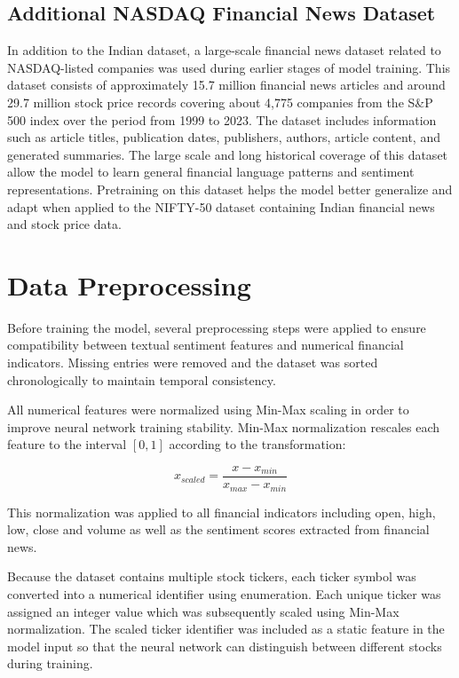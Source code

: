 \documentclass[11pt]{article}
\begin{document}
\subsection{Additional NASDAQ Financial News Dataset}
In addition to the Indian dataset, a large-scale financial news dataset related to NASDAQ-listed companies was used during earlier stages of model training. This dataset consists of approximately 15.7 million financial news articles and around 29.7 million stock price records covering about 4,775 companies from the S\&P 500 index over the period from 1999 to 2023. The dataset includes information such as article titles, publication dates, publishers, authors, article content, and generated summaries. The large scale and long historical coverage of this dataset allow the model to learn general financial language patterns and sentiment representations. Pretraining on this dataset helps the model better generalize and adapt when applied to the NIFTY-50 dataset containing Indian financial news and stock price data.

\section{Data Preprocessing}

Before training the model, several preprocessing steps were applied to ensure compatibility between textual sentiment features and numerical financial indicators. Missing entries were removed and the dataset was sorted chronologically to maintain temporal consistency.

All numerical features were normalized using Min-Max scaling in order to improve neural network training stability. Min-Max normalization rescales each feature to the interval $[0,1]$ according to the transformation:

\[
x_{scaled} = \frac{x - x_{min}}{x_{max} - x_{min}}
\]

This normalization was applied to all financial indicators including open, high, low, close and volume as well as the sentiment scores extracted from financial news.

Because the dataset contains multiple stock tickers, each ticker symbol was converted into a numerical identifier using enumeration. Each unique ticker was assigned an integer value which was subsequently scaled using Min-Max normalization. The scaled ticker identifier was included as a static feature in the model input so that the neural network can distinguish between different stocks during training.
\end{document}
